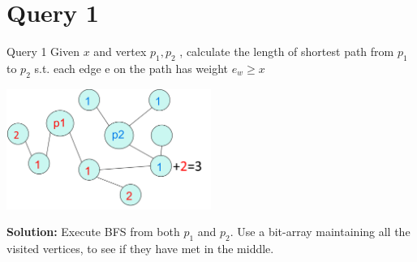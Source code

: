 \section{Query 1}
\begin{frame}{Query 1}
Given $x$ and vertex $p_1 ,p_2$ , calculate the length of shortest path
from $p_1$ to $p_2$ s.t. each edge e on the path has weight $ e_w \ge x$

\begin{center}
  \includegraphics[width=0.5\textwidth]{res/q1.png}
\end{center}

\textbf{Solution:} Execute BFS from both $p_1$ and $p_2$.
Use a bit-array maintaining all the
visited vertices, to see if they have met
in the middle.

\end{frame}
